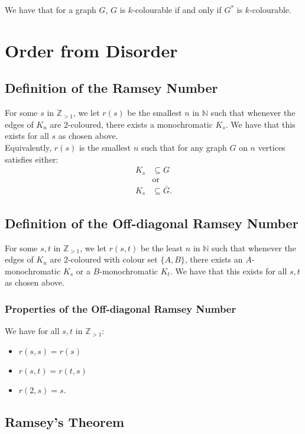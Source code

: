 \documentclass[a4paper, 12pt, twoside]{article}
\begin{document}
We have that for a graph $G$, $G$ is $k$-colourable if and only if $G^*$ is 
$k$-colourable.

\section{Order from Disorder}

\subsection{Definition of the Ramsey Number}

For some $s$ in $\mathbb{Z}_{> 1}$, we let $r(s)$ be the smallest $n$ in $\mathbb{N}$ 
such that whenever the edges of $K_n$ are $2$-coloured, there exists a monochromatic $K_s$.
We have that this exists for all $s$ as chosen above.
\\[\baselineskip]
Equivalently, $r(s)$ is the smallest $n$ such that for any graph $G$ on $n$
vertices satisfies either: \begin{align*}
  K_s &\subseteq G \\
  &\text{or} \\
  K_s &\subseteq \bar{G}.
\end{align*}

\subsection{Definition of the Off-diagonal Ramsey Number}

For some $s, t$ in $\mathbb{Z}_{> 1}$, we let $r(s, t)$ be the least $n$ in $\mathbb{N}$
such that whenever the edges of $K_n$ are $2$-coloured with colour set $\{A, B\}$, 
there exists an $A$-monochromatic $K_s$ or a $B$-monochromatic $K_t$.
We have that this exists for all $s, t$ as chosen above.

\subsubsection{Properties of the Off-diagonal Ramsey Number}

We have for all $s, t$ in $\mathbb{Z}_{> 1}$: \begin{itemize}
  \item $r(s, s) = r(s)$
  \item $r(s, t) = r(t, s)$
  \item $r(2, s) = s$.
\end{itemize}

\subsection{Ramsey's Theorem}
\end{document}
